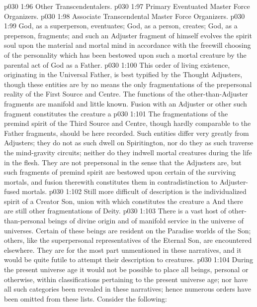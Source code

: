 \vs p030 1:96 \bibnobreakspace Other Transcendentalers.
\vs p030 1:97 \bibnobreakspace Primary Eventuated Master Force Organizers.
\vs p030 1:98 \bibnobreakspace Associate Transcendental Master Force Organizers.
\vs p030 1:99 \pc God, as a superperson, eventuates; God, as a person, creates; God, as a preperson, fragments; and such an Adjuster fragment of himself evolves the spirit soul upon the material and mortal mind in accordance with the freewill choosing of the personality which has been bestowed upon such a mortal creature by the parental act of God as a Father.
\vsetspace
\vs p030 1:100 \bibnobreakspace {} This order of living existence, originating in the Universal Father, is best typified by the Thought Adjusters, though these entities are by no means the only fragmentations of the prepersonal reality of the First Source and Centre. The functions of the other\hyp{}than\hyp{}Adjuster fragments are manifold and little known. Fusion with an Adjuster or other such fragment constitutes the creature a 
\vs p030 1:101 The fragmentations of the premind spirit of the Third Source and Centre, though hardly comparable to the Father fragments, should be here recorded. Such entities differ very greatly from Adjusters; they do not as such dwell on Spiritington, nor do they as such traverse the mind\hyp{}gravity circuits; neither do they indwell mortal creatures during the life in the flesh. They are not prepersonal in the sense that the Adjusters are, but such fragments of premind spirit are bestowed upon certain of the surviving mortals, and fusion therewith constitutes them  in contradistinction to Adjuster\hyp{}fused mortals.
\vs p030 1:102 Still more difficult of description is the individualized spirit of a Creator Son, union with which constitutes the creature a  And there are still other fragmentations of Deity.
\vsetspace
\vs p030 1:103 \bibnobreakspace {} There is a vast host of other\hyp{}than\hyp{}personal beings of divine origin and of manifold service in the universe of universes. Certain of these beings are resident on the Paradise worlds of the Son; others, like the superpersonal representatives of the Eternal Son, are encountered elsewhere. They are for the most part unmentioned in these narratives, and it would be quite futile to attempt their description to  creatures.
\vsetspace
\vs p030 1:104 \bibnobreakspace {} During the present universe age it would not be possible to place all beings, personal or otherwise, within classifications pertaining to the present universe age; nor have all such categories been revealed in these narratives; hence numerous orders have been omitted from these lists. Consider the following:
